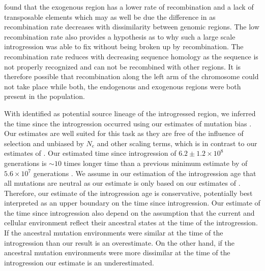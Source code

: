 \citet{payen2009} found that the exogenous region has a lower rate of recombination and a lack of transposable elements which may as well be due the difference in \GC as recombination rate decreases with dissimilarity between genomic regions.
The low recombination rate also provides a hypothesis as to why such a large scale introgression was able to fix without being broken up by recombination.
The recombination rate reduces with decreasing sequence homology as the sequence is not properly recognized and can not be recombined with other regions.
It is therefore possible that recombination along the left arm of the \kluyveri chromosome could not take place while both, the endogenous and exogenous regions were both present in the population.

With \gossypii identified as potential source lineage of the introgressed region, we inferred the time since the introgression occurred using our estimates of mutation bias \DM.
Our \DM estimates are well suited for this task as they are free of the influence of selection and unbiased by $N_e$ and other scaling terms, which is in contrast to our estimates of \DE \citep{gilchrist2015}.
Our estimated time since introgression of $6.2\pm1.2\times 10^8$ generations is $\sim 10$ times longer time than a previous minimum estimate by \citet{friedrich2015} of $5.6\times 10^7$ generations .
We assume in our estimation of the introgression age that all mutations are neutral as our estimate is only based on our estimates of \DM.
Therefore, our estimate of the introgression age is conservative, potentially best interpreted as an upper boundary on the time since introgression.
Our estimate of the time since introgression also depend on the assumption that the current \gossypii and \kluyveri cellular environment reflect their ancestral states at the time of the introgression.
If the ancestral mutation environments were similar at the time of the introgression than our result is an overestimate.
On the other hand, if the ancestral mutation environments were more dissimilar at the time of the introgression our estimate is an underestimated.

